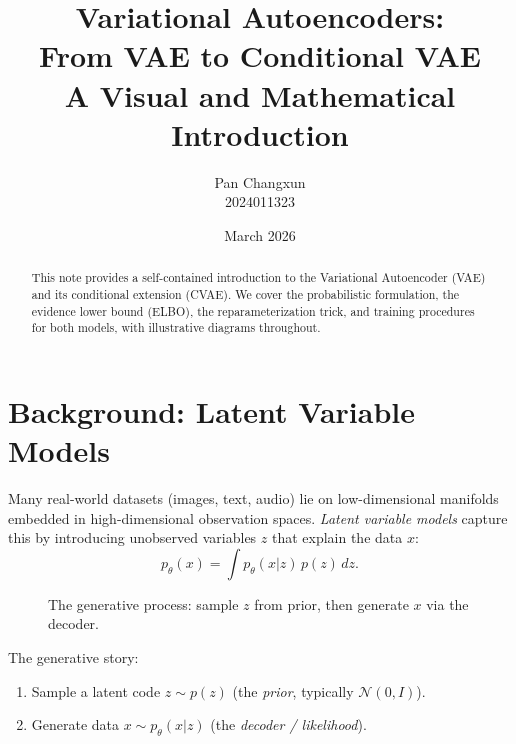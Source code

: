 \documentclass{article}
\title{
    Variational Autoencoders: \\
    From VAE to Conditional VAE \\[6pt]
    \large A Visual and Mathematical Introduction
}
\author{
    Pan Changxun \\
    2024011323
}
\date{March 2026}
\begin{document}
\maketitle

\begin{abstract}
This note provides a self-contained introduction to the Variational Autoencoder (VAE) and its conditional extension (CVAE). We cover the probabilistic formulation, the evidence lower bound (ELBO), the reparameterization trick, and training procedures for both models, with illustrative diagrams throughout.
\end{abstract}

\tableofcontents
\newpage

\section{Background: Latent Variable Models}

Many real-world datasets (images, text, audio) lie on low-dimensional manifolds embedded in high-dimensional observation spaces. \emph{Latent variable models} capture this by introducing unobserved variables $z$ that explain the data $x$:
\[
    p_\theta(x) = \int p_\theta(x|z)\,p(z)\,dz.
\]

\begin{figure}[H]
\centering
{}
\caption{The generative process: sample $z$ from prior, then generate $x$ via the decoder.}
\label{fig:gen-process}
\end{figure}

The generative story:
\begin{enumerate}
    \item Sample a latent code $z \sim p(z)$ (the \emph{prior}, typically $\mathcal{N}(0,I)$).
    \item Generate data $x \sim p_\theta(x|z)$ (the \emph{decoder / likelihood}).
\end{enumerate}
\end{document}
